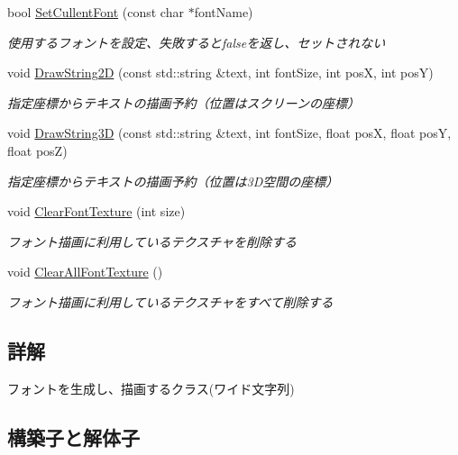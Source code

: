 \begin{DoxyCompactItemize}
bool \mbox{\hyperlink{class_k___graphics_1_1_font_renderer_afde212f8e56262e86ef01d12b2704dbd}{Set\+Cullent\+Font}} (const char $\ast$font\+Name)
\begin{DoxyCompactList}\small\item\em 使用するフォントを設定、失敗するとfalseを返し、セットされない \end{DoxyCompactList}\item 
void \mbox{\hyperlink{class_k___graphics_1_1_font_renderer_a8d3687d4a4dad3682ab2bfa29e9cc15b}{Draw\+String2D}} (const std\+::string \&text, int font\+Size, int posX, int posY)
\begin{DoxyCompactList}\small\item\em 指定座標からテキストの描画予約（位置はスクリーンの座標） \end{DoxyCompactList}\item 
void \mbox{\hyperlink{class_k___graphics_1_1_font_renderer_adfb9bb5d77fdcb2a52c5ce5b7f011a67}{Draw\+String3D}} (const std\+::string \&text, int font\+Size, float posX, float posY, float posZ)
\begin{DoxyCompactList}\small\item\em 指定座標からテキストの描画予約（位置は3\+D空間の座標） \end{DoxyCompactList}\item 
void \mbox{\hyperlink{class_k___graphics_1_1_font_renderer_ace5f43f6cbd1a5b18e41350ca2e64dea}{Clear\+Font\+Texture}} (int size)
\begin{DoxyCompactList}\small\item\em フォント描画に利用しているテクスチャを削除する \end{DoxyCompactList}\item 
void \mbox{\hyperlink{class_k___graphics_1_1_font_renderer_a7e75db1a4ddf8bb6c888ece135783673}{Clear\+All\+Font\+Texture}} ()
\begin{DoxyCompactList}\small\item\em フォント描画に利用しているテクスチャをすべて削除する \end{DoxyCompactList}\end{DoxyCompactItemize}


\subsection{詳解}
フォントを生成し、描画するクラス(ワイド文字列) 

\subsection{構築子と解体子}
\mbox{\label{class_k___graphics_1_1_font_renderer_a1c3ac227f5eb40934d5d5ea84c80c96b}} 
